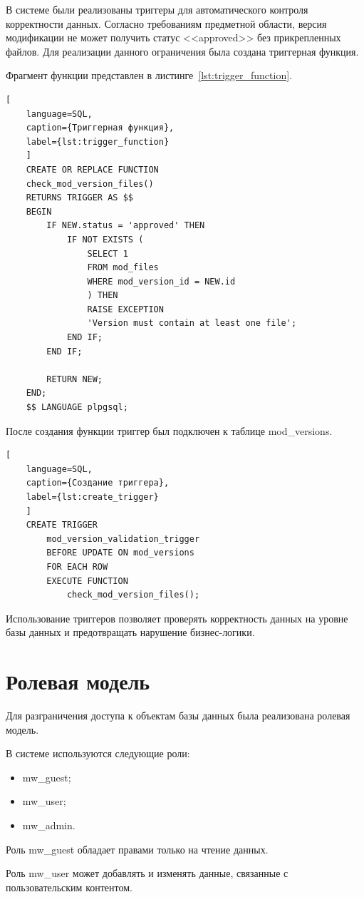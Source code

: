 В системе были реализованы триггеры для автоматического контроля
корректности данных.
Согласно требованиям предметной области, версия модификации не может
получить статус <<approved>> без прикрепленных файлов.
Для реализации данного ограничения была создана триггерная функция.

Фрагмент функции представлен в
листинге~\ref{lst:trigger_function}.

\begin{lstlisting}[
	language=SQL,
	caption={Триггерная функция},
	label={lst:trigger_function}
	]
	CREATE OR REPLACE FUNCTION
	check_mod_version_files()
	RETURNS TRIGGER AS $$
	BEGIN
		IF NEW.status = 'approved' THEN
			IF NOT EXISTS (
				SELECT 1
				FROM mod_files
				WHERE mod_version_id = NEW.id
				) THEN
				RAISE EXCEPTION
				'Version must contain at least one file';
			END IF;
		END IF;
	
		RETURN NEW;
	END;
	$$ LANGUAGE plpgsql;
\end{lstlisting}

После создания функции триггер был подключен к таблице mod\_versions.

\begin{lstlisting}[
	language=SQL,
	caption={Создание триггера},
	label={lst:create_trigger}
	]
	CREATE TRIGGER
		mod_version_validation_trigger
		BEFORE UPDATE ON mod_versions
		FOR EACH ROW
		EXECUTE FUNCTION
			check_mod_version_files();
\end{lstlisting}

Использование триггеров позволяет проверять корректность
данных на уровне базы данных и предотвращать нарушение бизнес-логики.

\section{Ролевая модель}

Для разграничения доступа к объектам базы данных была реализована
ролевая модель.

В системе используются следующие роли:

\begin{itemize}
	\item mw\_guest;
	\item mw\_user;
	\item mw\_admin.
\end{itemize}

Роль mw\_guest обладает правами только на чтение данных.

Роль mw\_user может добавлять и изменять данные, связанные с
пользовательским контентом.

